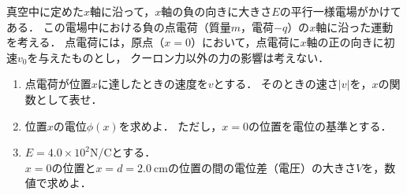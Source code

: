 ﻿\documentclass[../../../ps_q.tex]{subfiles}
\begin{document}
    真空中に定めた$x$軸に沿って，$x$軸の負の向きに大きさ$E$の平行一様電場がかけてある．%
    この電場中における負の点電荷（質量$m$，電荷$-q$）の$x$軸に沿った運動を考える．%
    点電荷には，原点（$x=0$）において，点電荷に$x$軸の正の向きに初速$v_0$を与えたものとし，%
    クーロン力以外の力の影響は考えない．

    \begin{enumerate}
        \item%
            点電荷が位置$x$に達したときの速度を$v$とする．%
            そのときの速さ$|v|$を，$x$の関数として表せ．
        \item%
            位置$x$の電位$\phi(x)$を求めよ．%
            ただし，$x=0$の位置を電位の基準とする．
        \item%
            $E=4.0 \times 10^2$\:N/Cとする．\\    
            $x=0$の位置と$x=d=2.0\:\mathrm{cm}$の位置の間の電位差（電圧）の大きさ$V$を，数値で求めよ．
    \end{enumerate}
\end{document}
